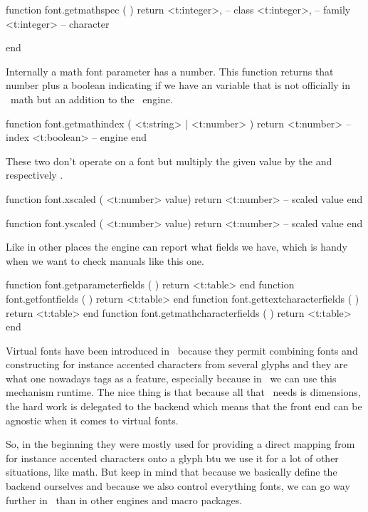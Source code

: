 \starttyping [option=LUA]
function font.getmathspec ( )
    return
        <t:integer>, -- class
        <t:integer>, -- family
        <t:integer>  -- character

end
\stoptyping

Internally a math font parameter has a number. This function returns that number
plus a boolean indicating if we have an variable that is not officially in
\OPENTYPE\ math but an addition to the \LUAMETATEX\ engine.

\starttyping [option=LUA]
function font.getmathindex ( <t:string> | <t:number> )
    return
        <t:number>  -- index
        <t:boolean> -- engine
end
\stoptyping

These two don't operate on a font but multiply the given value by the \type
{\glyphscale} and \type {\glyphxscale} respectively
\type {\glyphyscale}.

\starttyping [option=LUA]
function font.xscaled ( <t:number> value)
    return <t:number> -- scaled value
end
\stoptyping

\starttyping [option=LUA]
function font.yscaled ( <t:number> value)
    return <t:number> -- scaled value
end
\stoptyping

Like in other places the engine can report what fields we have, which is handy
when we want to check manuals like this one.

\starttyping [option=LUA]
function font.getparameterfields     ( ) return <t:table> end
function font.getfontfields          ( ) return <t:table> end
function font.gettextcharacterfields ( ) return <t:table> end
function font.getmathcharacterfields ( ) return <t:table> end
\stoptyping

\stopsection

\startsection[title={Virtual fonts}]

Virtual fonts have been introduced in \TEX\ because they permit combining fonts
and constructing for instance accented characters from several glyphs and they
are what one nowadays tags as a  feature, especially because in
\LUATEX\ we can use this mechanism runtime. The nice thing is that because all
that \TEX\ needs is dimensions, the hard work is delegated to the backend which
means that the front end can be agnostic when it comes to virtual fonts.

So, in the beginning they were mostly used for providing a direct mapping from
for instance accented characters onto a glyph btu we use it for a lot of other
situations, like math. But keep in mind that because we basically define the
backend ourselves and because we also control everything fonts, we can go way
further in \CONTEXT\ than in other engines and macro packages.

